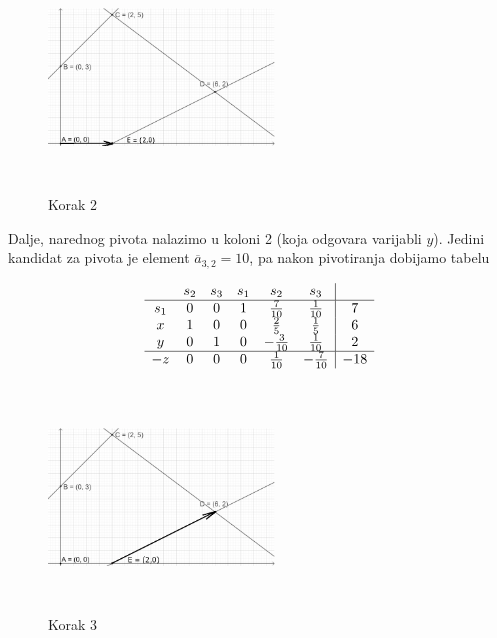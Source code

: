\documentclass[a4paper, utf8, 11pt, colorlinks]{article}
\begin{document}
\begin{figure}[!ht]
	\centering
	\includegraphics[width=170pt, height=170pt]{simpleks-primjer-2-sl2.eps}
	\caption{Korak 2}
	\label{fig:step-2}
\end{figure}
Dalje, narednog pivota nalazimo u koloni 2 (koja odgovara varijabli $y$). Jedini kandidat za pivota je element $\overline{a}_{3, 2}= 10$, pa nakon pivotiranja dobijamo tabelu 

$$\begin{array}{cccccc| c}
	& s_2  & s_3   & s_1  & s_2 & s_3 &     \\ \hline
s_1 & 0    &  0    & 1    &  \frac{7}{10}  & \frac{1}{10} &   7  \\  
x   & 1    &  0    & 0    &  \frac{2}{5}   & \frac{1}{5}  &   6  \\
y   & 0    &  1    & 0    & - \frac{3}{10}  & \frac{1}{10} &   2  \\ \hline
-z  & 0    &  0    & 0    &   \frac{1}{10} &-\frac{7}{10}  &  -18 \\ 
\end{array}
$$ 

\begin{figure}[H]
	\centering
	\includegraphics[width=170pt, height=170pt]{simpleks-primjer-2-sl3.eps}
	\caption{Korak 3}
	\label{fig:step-3}
\end{figure}
\end{document}
